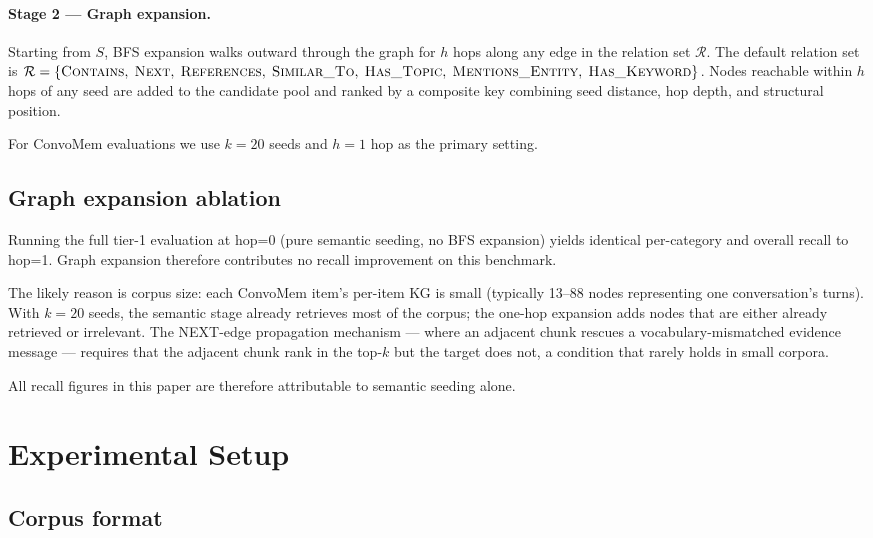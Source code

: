\documentclass[11pt,a4paper]{article}
\begin{document}
\paragraph{Stage 2 --- Graph expansion.}
Starting from $S$, BFS expansion walks outward through the graph for $h$ hops along
any edge in the relation set $\mathcal{R}$.
The default relation set is
$\mathcal{R} = \{\textsc{Contains},\;\textsc{Next},\;\textsc{References},\;
  \textsc{Similar\_To},\;\textsc{Has\_Topic},\;\textsc{Mentions\_Entity},\;
  \textsc{Has\_Keyword}\}$.
Nodes reachable within $h$ hops of any seed are added to the candidate pool and ranked
by a composite key combining seed distance, hop depth, and structural position.

For ConvoMem evaluations we use $k{=}20$ seeds and $h{=}1$ hop as the primary setting.

\subsection{Graph expansion ablation}

Running the full tier-1 evaluation at hop=0 (pure semantic seeding, no BFS
expansion) yields identical per-category and overall recall to hop=1.
Graph expansion therefore contributes no recall improvement on this benchmark.

The likely reason is corpus size: each ConvoMem item's per-item KG is small
(typically 13--88 nodes representing one conversation's turns).
With $k{=}20$ seeds, the semantic stage already retrieves most of the corpus;
the one-hop expansion adds nodes that are either already retrieved or irrelevant.
The NEXT-edge propagation mechanism --- where an adjacent chunk rescues a
vocabulary-mismatched evidence message --- requires that the adjacent chunk
rank in the top-$k$ but the target does not, a condition that rarely holds
in small corpora.

All recall figures in this paper are therefore attributable to semantic seeding
alone.

\section{Experimental Setup}
\label{sec:setup}

\subsection{Corpus format}
\end{document}
